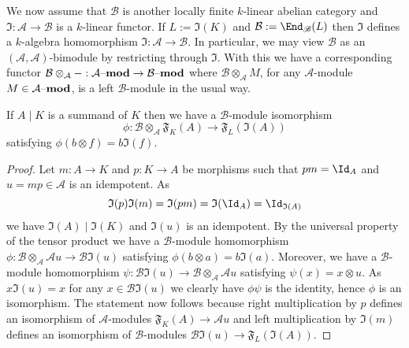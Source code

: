 \documentclass[eqthmnum,nocolour,skinny]{jt-calcs}
\newcommand{\lmod}[1]{\ensuremath{#1\text{--{\bf mod}}}}
\begin{document}
\begin{pa}
We now assume that $\mathscr{B}$ is another locally finite $k$-linear abelian category and $\mathfrak{I} : \mathscr{A} \to \mathscr{B}$ is a $k$-linear functor. If $L := \mathfrak{I}(K)$ and $\mathcal{B} := \End_{\mathscr{B}}(L)$ then $\mathfrak{I}$ defines a $k$-algebra homomorphism $\mathfrak{I} : \mathcal{A} \to \mathcal{B}$. In particular, we may view $\mathcal{B}$ as an $(\mathcal{A},\mathcal{A})$-bimodule by restricting through $\mathfrak{I}$. With this we have a corresponding functor $\mathcal{B}\otimes_{\mathcal{A}}- : \lmod{\mathcal{A}} \to \lmod{\mathcal{B}}$ where $\mathcal{B}\otimes_{\mathcal{A}} M$, for any $\mathcal{A}$-module $M \in \lmod{\mathcal{A}}$, is a left $\mathcal{B}$-module in the usual way.
\end{pa}

\begin{lem}\label{lem:I-func-is-ind}
If $A \mid K$ is a summand of $K$ then we have a $\mathcal{B}$-module isomorphism
\begin{equation*}
\phi : \mathcal{B} \otimes_{\mathcal{A}} \mathfrak{F}_K(A) \to \mathfrak{F}_L(\mathfrak{I}(A))
\end{equation*}
satisfying $\phi(b \otimes f) = b\mathfrak{I}(f)$.
\end{lem}

\begin{proof}
Let $m : A \to K$ and $p : K \to A$ be morphisms such that $pm = \Id_A$ and $u = mp \in \mathcal{A}$ is an idempotent. As
\begin{equation*}
\mathfrak{I}(p)\mathfrak{I}(m) = \mathfrak{I}(pm) = \mathfrak{I}(\Id_A) = \Id_{\mathfrak{I}(A)}
\end{equation*}
we have $\mathfrak{I}(A) \mid \mathfrak{I}(K)$ and $\mathfrak{I}(u)$ is an idempotent. By the universal property of the tensor product we have a $\mathcal{B}$-module homomorphism $\phi : \mathcal{B} \otimes_{\mathcal{A}} \mathcal{A}u \to \mathcal{B}\mathfrak{I}(u)$ satisfying $\phi(b \otimes a) = b\mathfrak{I}(a)$. Moreover, we have a $\mathcal{B}$-module homomorphism $\psi : \mathcal{B}\mathfrak{I}(u) \to \mathcal{B} \otimes_{\mathcal{A}} \mathcal{A}u$ satisfying $\psi(x) = x \otimes u$. As $x\mathfrak{I}(u) = x$ for any $x \in \mathcal{B}\mathfrak{I}(u)$ we clearly have $\phi\psi$ is the identity, hence $\phi$ is an isomorphism. The statement now follows because right multiplication by $p$ defines an isomorphism of $\mathcal{A}$-modules $\mathfrak{F}_K(A) \to \mathcal{A}u$ and left multiplication by $\mathfrak{I}(m)$ defines an isomorphism of $\mathcal{B}$-modules $\mathcal{B}\mathfrak{I}(u) \to \mathfrak{F}_L(\mathfrak{I}(A))$.
\end{proof}
\end{document}
